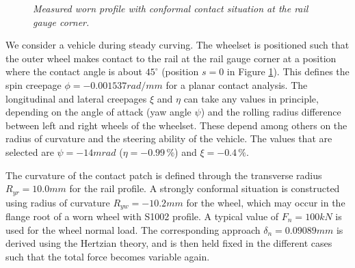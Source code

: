 \documentclass[12pt]{report}
\begin{document}
\begin{figure}[bt]
\centering
{}
\caption{\em Measured worn profile with conformal contact situation
        at the rail gauge corner.}
\label{fig:worn_profile}
\end{figure}

We consider a vehicle during steady curving. The wheelset is positioned
such that the outer wheel makes contact to the rail at the rail gauge
corner at a position where the contact angle is about $45^\circ$ (position
$s=0$ in Figure \ref{fig:worn_profile}). This defines the spin creepage
$\phi=-0.001537\unit{rad/mm}$ for a planar contact analysis. The longitudinal
and lateral creepages $\xi$ and $\eta$ can take any values in principle,
depending on the angle of attack (yaw angle $\psi$) and the rolling radius
difference between left and right wheels of the wheelset. These depend
among others on the radius of curvature and the steering ability of the
vehicle. The values that are selected are $\psi=-14\unit{mrad}$
($\eta=-0.99\,\%$) and $\xi=-0.4\,\%$.

The curvature of the contact patch is defined through the transverse radius
$R_{yr}=10.0\unit{mm}$ for the rail profile. A strongly conformal situation is
constructed using radius of curvature $R_{yw}=-10.2\unit{mm}$ for the wheel, which
may occur in the flange root of a worn wheel with S1002 profile. A typical
value of $F_n=100\unit{kN}$ is used for the wheel normal load. The corresponding
approach $\delta_n=0.09089\unit{mm}$ is derived using the Hertzian theory, and is
then held fixed in the different cases such that the total force becomes
variable again.
\end{document}
